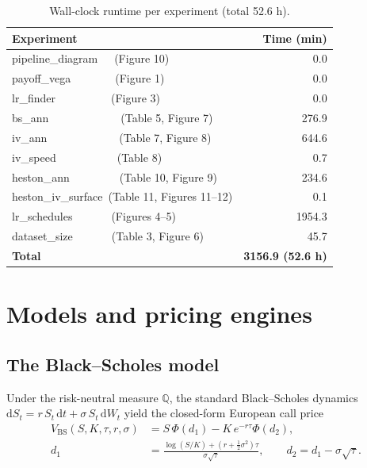 \documentclass[11pt,a4paper]{article}
\newcommand{\Q}{\mathbb{Q}}
\newcommand{\bs}{\mathrm{BS}}
\begin{document}
\begin{table}[H]
\centering
\caption{Wall-clock runtime per experiment (total 52.6 h).}
\label{tab:runtime}
\begin{tabular}{lr}
\toprule
\textbf{Experiment} & \textbf{Time (min)} \\
\midrule
pipeline\_diagram~~~(Figure 10)                  & 0.0 \\
payoff\_vega~~~~~~~~(Figure 1)                   & 0.0 \\
lr\_finder~~~~~~~~~~(Figure 3)                   & 0.0 \\
bs\_ann~~~~~~~~~~~~~(Table 5, Figure 7)          & 276.9 \\
iv\_ann~~~~~~~~~~~~~(Table 7, Figure 8)          & 644.6 \\
iv\_speed~~~~~~~~~~~(Table 8)                    & 0.7 \\
heston\_ann~~~~~~~~~(Table 10, Figure 9)         & 234.6 \\
heston\_iv\_surface~(Table 11, Figures 11--12)   & 0.1 \\
lr\_schedules~~~~~~~(Figures 4--5)               & 1954.3 \\
dataset\_size~~~~~~~(Table 3, Figure 6)          & 45.7 \\
\midrule
\textbf{Total} & \textbf{3156.9 (52.6 h)} \\
\bottomrule
\end{tabular}
\end{table}

\section{Models and pricing engines}
\label{sec:models}

\subsection{The Black--Scholes model}

Under the risk-neutral measure $\Q$, the standard Black--Scholes dynamics
$\mathrm{d}S_t = r\, S_t\, \mathrm{d}t + \sigma\, S_t\, \mathrm{d}W_t$ yield the
closed-form European call price
\begin{align}
V_{\bs}(S, K, \tau, r, \sigma) &= S\, \Phi(d_1) - K\, e^{-r\tau} \Phi(d_2),
\label{eq:bs}\\
d_1 &= \frac{\log(S/K) + (r + \tfrac{1}{2}\sigma^2)\tau}{\sigma\sqrt{\tau}},
\qquad d_2 = d_1 - \sigma\sqrt{\tau}. \nonumber
\end{align}
\end{document}
